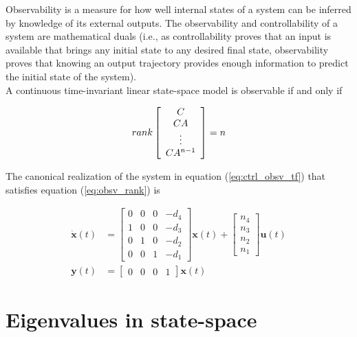 \documentclass[10pt,conference,compsoc]{IEEEtran}
\newcommand{\mtx}[1] {\bm #1}
\begin{document}
\noindent Observability is a measure for how well internal \glspl{state} of a
\gls{system} can be inferred by knowledge of its external outputs. The
observability and controllability of a \gls{system} are mathematical duals
(i.e., as controllability proves that an input is available that brings any
initial \gls{state} to any desired final \gls{state}, observability proves that
knowing an output trajectory provides enough information to predict the
initial \gls{state} of the \gls{system}). \\

\noindent A continuous \gls{time-invariant} linear state-space model is
observable if and only if

\begin{equation} \label{eq:obsv_rank}
  rank \left[
  \begin{array}{c}
    C \\
    CA \\
    \vdots \\
    CA^{n-1}
  \end{array}
  \right] = n \\
\end{equation}

\noindent The canonical realization of the \gls{system} in equation
(\ref{eq:ctrl_obsv_tf}) that satisfies equation (\ref{eq:obsv_rank}) is

\begin{align}
  \dot{\mtx{x}}(t) &= \left[
  \begin{array}{cccc}
    0 & 0 & 0 & -d_4 \\
    1 & 0 & 0 & -d_3 \\
    0 & 1 & 0 & -d_2 \\
    0 & 0 & 1 & -d_1
  \end{array}
  \right] \mtx{x}(t) + \left[
  \begin{array}{c}
    n_4 \\
    n_3 \\
    n_2 \\
    n_1
  \end{array}
  \right] \mtx{u}(t) \\
  \mtx{y}(t) &= \left[
  \begin{array}{cccc}
    0 & 0 & 0 & 1
  \end{array}
  \right] \mtx{x}(t)
\end{align}

\section{Eigenvalues in state-space}
\end{document}
